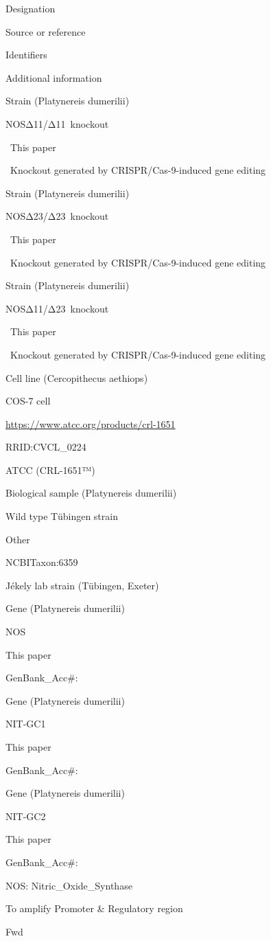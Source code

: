 \documentclass[
  10pt,
  onecolumn]{article}
\begin{document}
Designation

Source or reference

Identifiers

Additional information

Strain (Platynereis dumerilii)

NOSΔ11/Δ11~knockout

~This paper

~Knockout generated by CRISPR/Cas-9-induced gene editing

Strain (Platynereis dumerilii)

NOSΔ23/Δ23~knockout

~This paper

~Knockout generated by CRISPR/Cas-9-induced gene editing

Strain (Platynereis dumerilii)

NOSΔ11/Δ23~knockout

~This paper

~Knockout generated by CRISPR/Cas-9-induced gene editing

Cell line (Cercopithecus aethiops)

COS-7 cell

\url{https://www.atcc.org/products/crl-1651}

RRID:CVCL\_0224

ATCC (CRL-1651™)

Biological sample (Platynereis dumerilii)

Wild type Tübingen strain

Other

NCBITaxon:6359

Jékely lab strain (Tübingen, Exeter)

Gene (Platynereis dumerilii)

NOS

This paper

GenBank\_Acc\#:

Gene (Platynereis dumerilii)

NIT-GC1

This paper

GenBank\_Acc\#:

Gene (Platynereis dumerilii)

NIT-GC2

This paper

GenBank\_Acc\#:

NOS: Nitric\_Oxide\_Synthase

To amplify Promoter \& Regulatory region

Fwd
\end{document}
